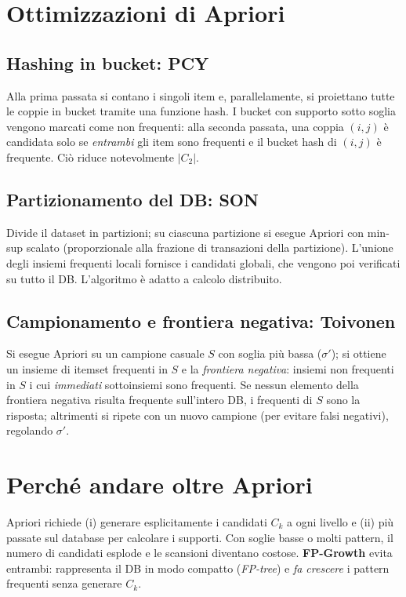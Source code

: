 \section{Ottimizzazioni di Apriori}\label{sec:apriori-opt}
\subsection{Hashing in bucket: PCY}\label{subsec:pcy}
Alla prima passata si contano i singoli item e, parallelamente, si proiettano tutte le coppie in bucket tramite una funzione hash. I bucket con supporto sotto soglia vengono marcati come non frequenti: alla seconda passata, una coppia $(i,j)$ è candidata solo se \emph{entrambi} gli item sono frequenti e il bucket hash di $(i,j)$ è frequente. Ciò riduce notevolmente $|C_2|$.

\subsection{Partizionamento del DB: SON}\label{subsec:son}
Divide il dataset in partizioni; su ciascuna partizione si esegue Apriori con min-sup scalato (proporzionale alla frazione di transazioni della partizione). L'unione degli insiemi frequenti locali fornisce i candidati globali, che vengono poi verificati su tutto il DB. L'algoritmo è adatto a calcolo distribuito.

\subsection{Campionamento e frontiera negativa: Toivonen}\label{subsec:toivonen}
Si esegue Apriori su un campione casuale $S$ con soglia più bassa ($\sigma'$); si ottiene un insieme di itemset frequenti in $S$ e la \emph{frontiera negativa}: insiemi non frequenti in $S$ i cui \emph{immediati} sottoinsiemi sono frequenti. Se nessun elemento della frontiera negativa risulta frequente sull'intero DB, i frequenti di $S$ sono la risposta; altrimenti si ripete con un nuovo campione (per evitare falsi negativi), regolando $\sigma'$.

\section{Perch\'e andare oltre Apriori}\label{sec:oltre-apriori}
Apriori richiede (i) generare esplicitamente i candidati $C_k$ a ogni livello e (ii) pi\`u passate sul database per calcolare i supporti. Con soglie basse o molti pattern, il numero di candidati esplode e le scansioni diventano costose. \textbf{FP-Growth} evita entrambi: rappresenta il DB in modo compatto (\emph{FP-tree}) e \emph{fa crescere} i pattern frequenti senza generare $C_k$.

